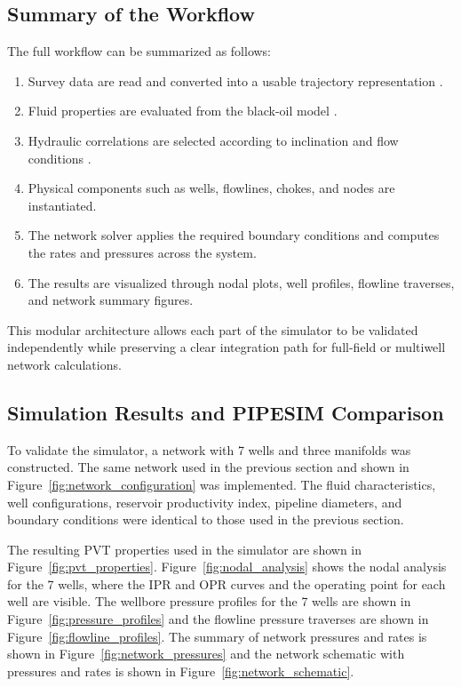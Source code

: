\subsection*{Summary of the Workflow}

The full workflow can be summarized as follows:

\begin{enumerate}
    \item Survey data are read and converted into a usable trajectory
          representation \cite{Wolff1981}.
    \item Fluid properties are evaluated from the black-oil model
          \cite{Standing1977}.
    \item Hydraulic correlations are selected according to inclination and flow
          conditions \cite{BeggsBrill1973,HagedornBrown1965}.
    \item Physical components such as wells, flowlines, chokes, and nodes are
          instantiated.
    \item The network solver applies the required boundary conditions and
          computes the rates and pressures across the system.
    \item The results are visualized through nodal plots, well profiles,
          flowline traverses, and network summary figures.
\end{enumerate}

This modular architecture allows each part of the simulator to be validated
independently while preserving a clear integration path for full-field or
multiwell network calculations.

\subsection{Simulation Results and PIPESIM Comparison}

To validate the simulator, a network with 7 wells and three manifolds was
constructed. The same network used in the previous section and shown in
Figure~\ref{fig:network_configuration} was implemented. The fluid
characteristics, well configurations, reservoir productivity index, pipeline
diameters, and boundary conditions were identical to those used in the previous
section.

The resulting PVT properties used in the simulator are shown in
Figure~\ref{fig:pvt_properties}. Figure~\ref{fig:nodal_analysis}
shows the nodal analysis for the 7 wells, where the IPR and OPR curves and the
operating point for each well are visible. The wellbore pressure
profiles for the 7 wells are shown in Figure~\ref{fig:pressure_profiles} and the
flowline pressure traverses are shown in Figure~\ref{fig:flowline_profiles}. The
summary of network pressures and rates is shown in
Figure~\ref{fig:network_pressures} and the network schematic with pressures and
rates is shown in Figure~\ref{fig:network_schematic}.

